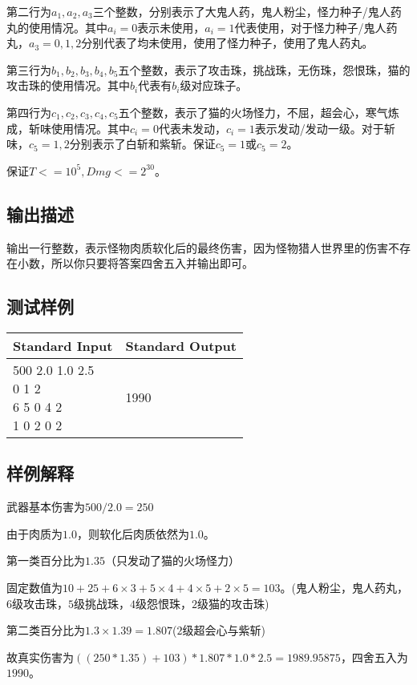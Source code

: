 第二行为$a_1,a_2,a_3$三个整数，分别表示了大鬼人药，鬼人粉尘，怪力种子/鬼人药丸的使用情况。其中$a_i=0$表示未使用，$a_i=1$代表使用，对于怪力种子/鬼人药丸，$a_3=0,1,2$分别代表了均未使用，使用了怪力种子，使用了鬼人药丸。

第三行为$b_1,b_2,b_3,b_4,b_5$五个整数，表示了攻击珠，挑战珠，无伤珠，怨恨珠，猫的攻击珠的使用情况。其中$b_i$代表有$b_i$级对应珠子。

第四行为$c_1,c_2,c_3,c_4,c_5$五个整数，表示了猫的火场怪力，不屈，超会心，寒气炼成，斩味使用情况。其中$c_i=0$代表未发动，$c_i=1$表示发动/发动一级。对于斩味，$c_5=1,2$分别表示了白斩和紫斩。保证$c_5=1$或$c_5=2$。

保证$T<=10^5,Dmg<=2^{30}$。

\subsection*{输出描述}

输出一行整数，表示怪物肉质软化后的最终伤害，因为怪物猎人世界里的伤害不存在小数，所以你只要将答案四舍五入并输出即可。

\subsection*{测试样例}

\begin{table}[H]
\begin{tabularx}{\textwidth}{|X|X|}
    \hline
    \textbf{Standard Input} & \textbf{Standard Output} \\ 
    \hline 
    \tablecell{
        500 2.0 1.0 2.5 \\
        0 1 2 \\
        6 5 0 4 2 \\
        1 0 2 0 2 \\
    } & 
    \tablecell{ 1990 \\} \\
    \hline
\end{tabularx}
\end{table}
\subsection*{样例解释}
武器基本伤害为$500/2.0=250$

由于肉质为$1.0$，则软化后肉质依然为$1.0$。

第一类百分比为$1.35$（只发动了猫的火场怪力）

固定数值为$10+25+6\times3+5\times4+4\times5+2\times5=103$。(鬼人粉尘，鬼人药丸，$6$级攻击珠，$5$级挑战珠，$4$级怨恨珠，$2$级猫的攻击珠)

第二类百分比为$1.3\times1.39=1.807$($2$级超会心与紫斩)

故真实伤害为$((250*1.35)+103)*1.807*1.0*2.5=1989.95875$，四舍五入为$1990$。